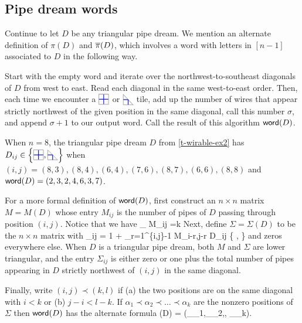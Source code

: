 \documentclass[10pt]{article}
\begin{document}
\subsection{Pipe dream words}

Continue to let $D$ be any triangular pipe dream.
We mention an alternate definition of $\pi(D)$ and $\overline{\pi}(D)$,
which involves
 a word with letters in $[n-1]$ associated to  $D$ in the following way.

Start with the empty word and iterate over the northwest-to-southeast diagonals of $D$ from west to east. Read each diagonal in the same west-to-east order. Then,
each time we encounter a $\PTILE$ or $\PDIAG$ tile, add up the number 
 of wires that appear strictly northwest of the given position in the same diagonal, call this number $\sigma$, and append  $\sigma+1$ to our output word. Call the result of this algorithm $\mathsf{word}(D)$.
 
 \begin{example}\label{word-ex}
When $n=8$,   the triangular pipe dream
$D$ from \eqref{t-wirable-ex2} has $D_{ij} \in \left\{ \PTILE, \PDIAG\right\}$
when $(i,j) = (8,3),(8,4), (6,4), (7,6), (8,7), (6,6),(8,8)$
and
$\mathsf{word}(D)=(2,3,2,4,6,3,7)$.
\end{example}

 For a more formal definition of $\mathsf{word}(D)$,
first construct an $n\times n$ matrix 
 $M=M(D)$ whose entry $M_{ij}$ is the number of pipes of $D$ passing through position $(i,j)$. Notice that we have 
\be\label{Mdiag-eq}
\sum_{} M_{ij} =k\quad{}
\ee
Next, define $\Sigma = \Sigma(D)$ to be the $n\times n$ matrix with 
\be\textstyle
 \Sigma_{ij} = 1 + \sum_{r=1}^{\min\{i,j\}-1} M_{i-r,j-r} \quad{}D_{ij} \in \left\{ \PTILE, \PDIAG\right\}
 \ee
 and zeros everywhere else.
 When $D$ is a triangular pipe dream, both $M$ and $\Sigma$ are lower triangular, and 
the entry
$\Sigma_{ij}$ is either zero or one plus the total number of pipes appearing in $D$ strictly northwest of $(i,j)$ in the same diagonal. 
 
Finally, write $(i,j)\prec (k,l)$
if (a) the two positions are on the same diagonal with $i<k$ or 
(b) $j-i < l-k$.
If $\alpha_1\prec \alpha_2\prec \dots\prec \alpha_k$ are the nonzero positions of $\Sigma$
then $\mathsf{word}(D)$  has the alternate  formula
\be\label{word-eq}
\word(D) = (\Sigma_{\alpha_1},\Sigma_{\alpha_2},\cdots, \Sigma_{\alpha_k}).
\ee
\end{document}
